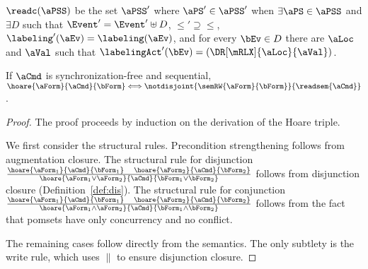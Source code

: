 

 $\readc(\aPSS)$ be the set $\aPSS'$ where $\aPS'\in\aPSS'$ when
$\exists\aPS\in\aPSS$ and  $\exists D$ such that $\Event'= \Event'\uplus D$,
${\le'} \supseteq{\le}$, $\labeling'(\aEv) = \labeling(\aEv)$, and for every
$\bEv\in D$ there are $\aLoc$ and $\aVal$ such that
$\labelingAct'(\bEv)=(\DR[\mRLX]{\aLoc}{\aVal})$.

\begin{theorem}
  \label{thm:hoare}
  If $\aCmd$ is synchronization-free and sequential,
  $\hoare{\aForm}{\aCmd}{\bForm}\Longleftrightarrow\notdisjoint{\semRW{\aForm}{\bForm}}{\readsem{\aCmd}}$.
\begin{proof}
  The proof proceeds by induction on the derivation of the Hoare triple.

  We first consider the structural rules.  Precondition strengthening follows
  from augmentation closure.   The structural rule for
  disjunction
  {\small\begin{math}
    \frac{\hoare{\aForm_1}{\aCmd}{\bForm_1}\quad  \hoare{\aForm_2}{\aCmd}{\bForm_2}}{ \hoare{\aForm_1 \lor \aForm_2}{\aCmd}{\bForm_1\lor \bForm_2}} 
  \end{math}}
follows from disjunction closure (Definition~\ref{def:dis}). The structural rule for conjunction
  {\small\begin{math}
    \frac{\hoare{\aForm_1}{\aCmd}{\bForm_1}\quad \hoare{\aForm_2}{\aCmd}{\bForm_2}}{ \hoare{\aForm_1 \land \aForm_2}{\aCmd}{\bForm_1\land \bForm_2}} 
  \end{math}}
  follows from the fact that pomsets have only concurrency and no conflict.  

  The remaining cases follow directly from the semantics.  The only subtlety
  is the write rule, which uses $\parallel$ to ensure disjunction closure.
\end{proof}
\end{theorem}

